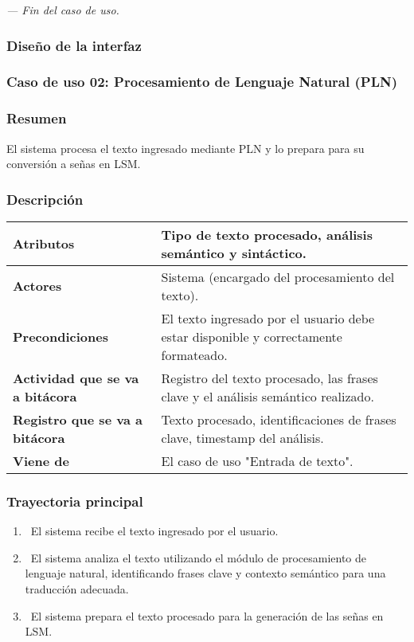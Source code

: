 \textit{--- Fin del caso de uso.}

\subsubsection{Diseño de la interfaz}

\subsubsection{Caso de uso 02: Procesamiento de Lenguaje Natural (PLN)}
\subsubsection{Resumen}
El sistema procesa el texto ingresado mediante PLN y lo prepara para su conversión a señas en LSM.
\subsubsection{Descripción}
\begin{table}[h]
    \centering
    \begin{longtable}{|l|p{10cm}|}  %
    \hline
    \textbf{Atributos} & Tipo de texto procesado, análisis semántico y sintáctico. \\ \hline
    \textbf{Actores} & Sistema (encargado del procesamiento del texto). \\ \hline
    \textbf{Precondiciones} & El texto ingresado por el usuario debe estar disponible y correctamente formateado. \\ \hline
    \textbf{Actividad que se va a bitácora} & Registro del texto procesado, las frases clave y el análisis semántico realizado. \\ \hline
    \textbf{Registro que se va a bitácora} & Texto procesado, identificaciones de frases clave, timestamp del análisis. \\ \hline
    \textbf{Viene de} & El caso de uso "Entrada de texto". \\ \hline
      
    \end{longtable}
\end{table}
    
\subsubsection{Trayectoria principal}
\begin{enumerate}[label=\textbf{\arabic*}, leftmargin=1.5cm]
    \item \UCsystem \ El sistema recibe el texto ingresado por el usuario.
    
    \item \UCsystem \ El sistema analiza el texto utilizando el módulo de procesamiento de lenguaje natural, identificando frases clave y contexto semántico para una traducción adecuada.
    
    \item \UCsystem \ El sistema prepara el texto procesado para la generación de las señas en LSM.

\end{enumerate}

